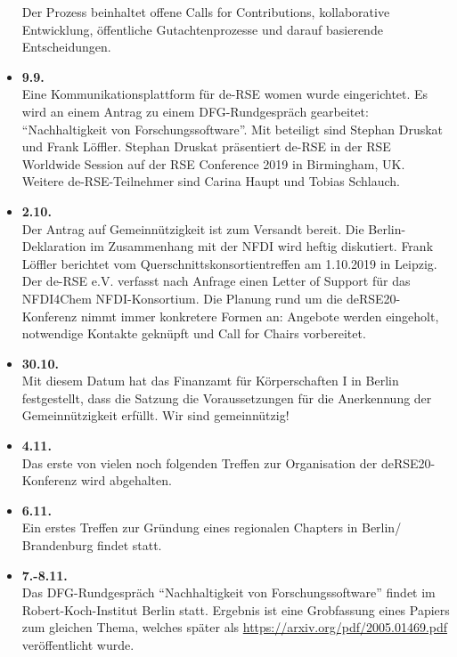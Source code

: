 \begin{itemize}
 Der Prozess beinhaltet offene Calls for Contributions, kollaborative Entwicklung, öffentliche Gutachtenprozesse und darauf basierende Entscheidungen.
 \item \textbf{9.9.}\\
 Eine Kommunikationsplattform für de-RSE women wurde eingerichtet.
 Es wird an einem Antrag zu einem DFG-Rundgespräch gearbeitet: "`Nachhaltigkeit von Forschungssoftware"'.
 Mit beteiligt sind Stephan Druskat und Frank Löffler.
 Stephan Druskat präsentiert de-RSE in der RSE Worldwide Session auf der RSE Conference 2019 in Birmingham, UK. 
 Weitere de-RSE-Teilnehmer sind Carina Haupt und Tobias Schlauch.
 \item \textbf{2.10.}\\
 Der Antrag auf Gemeinnützigkeit ist zum Versandt bereit. Die Berlin-Deklaration im Zusammenhang mit der NFDI wird heftig diskutiert. Frank Löffler berichtet vom Querschnittskonsortientreffen am 1.10.2019 in Leipzig. Der de-RSE e.V. verfasst nach Anfrage einen Letter of Support für das NFDI4Chem NFDI-Konsortium. Die Planung rund um die deRSE20-Konferenz nimmt immer konkretere Formen an: Angebote werden eingeholt, notwendige Kontakte geknüpft und Call for Chairs vorbereitet.

 \item \textbf{30.10.}\\
 Mit diesem Datum hat das Finanzamt für Körperschaften I in Berlin festgestellt, dass die Satzung die Voraussetzungen für die Anerkennung der Gemeinnützigkeit erfüllt. Wir sind gemeinnützig!

 \item \textbf{4.11.}\\
 Das erste von vielen noch folgenden Treffen zur Organisation der deRSE20-Konferenz wird abgehalten.

 \item \textbf{6.11.}\\
 Ein erstes Treffen zur Gründung eines regionalen Chapters in Berlin/ Brandenburg findet statt.

 \item \textbf{7.-8.11.}\\
 Das DFG-Rundgespräch "`Nachhaltigkeit von Forschungssoftware"' findet im Robert-Koch-Institut Berlin statt.
 Ergebnis ist eine Grobfassung eines Papiers zum gleichen Thema, welches später als \href{de-RSE Position Paper 001}{https://arxiv.org/pdf/2005.01469.pdf} veröffentlicht wurde.


\end{itemize}

